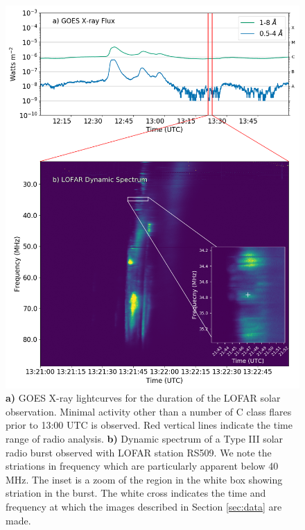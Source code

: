\begin{figure}
    \centering
    \includegraphics[width=\columnwidth]{Images/Burst_inset_goes_20200730.png}
    \caption[GOES X-ray lightcurves and dynamic spectrum for the duration of a LOFAR solar observation 2015-10-17.]{\textbf{a)} GOES X-ray lightcurves for the duration of the LOFAR solar observation. Minimal activity other than a number of C class flares prior to 13:00 UTC is observed. Red vertical lines indicate the time range of radio analysis. \textbf{b)} Dynamic spectrum of a Type III solar radio burst observed with LOFAR station RS509. We note the striations in frequency which are particularly apparent below 40 MHz. The inset is a zoom of the region in the white box showing striation in the burst. The white cross indicates the time and frequency at which the images described in Section \ref{sec:data} are made.}
    \label{fig:context}
\end{figure}

